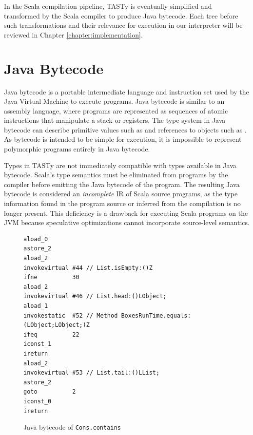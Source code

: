 In the Scala compilation pipeline, TASTy is eventually simplified and transformed by the Scala compiler to produce Java bytecode. 
Each tree before such transformations and their relevance for execution in our interpreter will be reviewed in Chapter \ref{chapter:implementation}.

\section{Java Bytecode}

Java bytecode is a portable intermediate language and instruction set used by the Java Virtual Machine to execute programs.
Java bytecode is similar to an assembly language, where programs are represented as sequences of atomic instructions that manipulate a stack or registers.
The type system in Java bytecode can describe primitive values such as  and references to objects such as .
As bytecode is intended to be simple for execution, it is impossible to represent polymorphic programs entirely in Java bytecode.

Types in TASTy are not immediately compatible with types available in Java bytecode.
Scala's type semantics must be eliminated from programs by the compiler before emitting the Java bytecode of the program.
The resulting Java bytecode is considered an \textit{incomplete} IR of Scala source programs, as the type information found in the program source or inferred from the compilation is no longer present.
This deficiency is a drawback for executing Scala programs on the JVM because speculative optimizations cannot incorporate source-level semantics.

\begin{figure}[!htb]
\begin{verbatim}
aload_0
astore_2
aload_2
invokevirtual #44 // List.isEmpty:()Z
ifne          30
aload_2
invokevirtual #46 // List.head:()LObject;
aload_1
invokestatic  #52 // Method BoxesRunTime.equals:(LObject;LObject;)Z
ifeq          22
iconst_1
ireturn
aload_2
invokevirtual #53 // List.tail:()LList;
astore_2
goto          2
iconst_0
ireturn
\end{verbatim}
\caption{Java bytecode of \texttt{Cons.contains}}
\label{example:contains-bytecode}
\end{figure}

